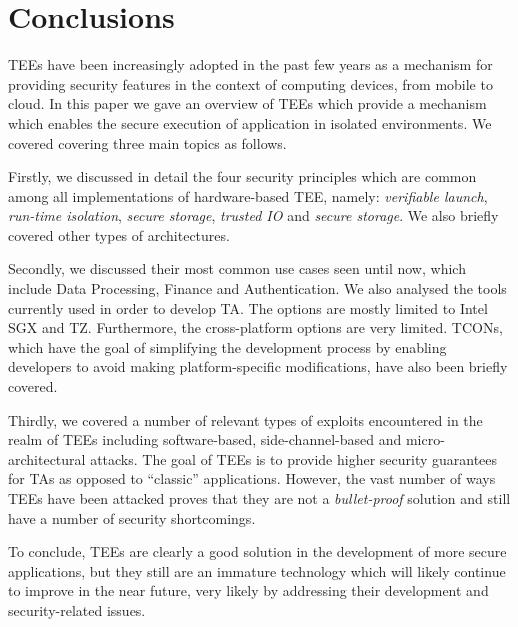 \documentclass[runningheads,a4paper]{uwsese}
\begin{document}



\section{Conclusions}

\glspl{TEE} have been increasingly adopted in the past few years as a mechanism
for providing security features in the context of computing devices, from
mobile to cloud. In this paper we gave an overview of \glspl{TEE} which provide
a mechanism which enables the secure execution of application in isolated
environments. We covered covering three main topics as follows.

Firstly, we discussed in detail the four security principles which are common
among all implementations of hardware-based \gls{TEE}, namely: \emph{verifiable
launch}, \emph{run-time isolation}, \emph{secure storage}, \emph{trusted IO}
and \emph{secure storage}. We also briefly covered other types of
architectures.

Secondly, we discussed their most common use cases seen until now, which
include Data Processing, Finance and Authentication. We also analysed the tools
currently used in order to develop \gls{TA}. The options are mostly limited to
Intel SGX and \gls{TZ}. Furthermore, the cross-platform options are very
limited. \glspl{TCON}, which have the goal of simplifying the development
process by enabling developers to avoid making platform-specific modifications,
have also been briefly covered.

Thirdly, we covered a number of relevant types of exploits encountered in the
realm of \glspl{TEE} including software-based, side-channel-based and
micro-architectural attacks. The goal of \glspl{TEE} is to provide higher
security guarantees for \glspl{TA} as opposed to ``classic'' applications.
However, the vast number of ways \glspl{TEE} have been attacked proves that
they are not a \emph{bullet-proof} solution and still have a number of security
shortcomings.

To conclude, \glspl{TEE} are clearly a good solution in the development of more
secure applications, but they still are an immature technology which will
likely continue to improve in the near future, very likely by addressing
their development and security-related issues.


\printglossary[type=\acronymtype]
\printglossary
\end{document}
